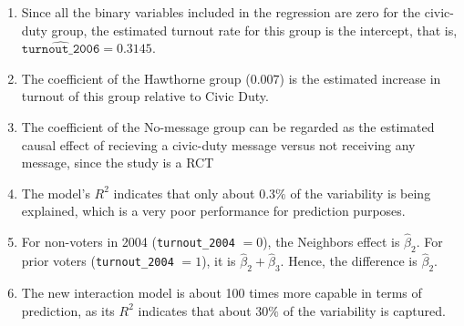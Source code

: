 \documentclass[11pt]{exam}
\begin{document}
\begin{questions}
\begin{solution}
\begin{enumerate}[label=(\alph*)]
  \item Since all the binary variables included in the regression are zero for the civic-duty group, the estimated turnout rate for this group is the intercept, that is, $\widehat{\texttt{turnout\_2006}} = 0.3145$.
  \item The coefficient of the Hawthorne group ($0.007$) is the estimated increase in turnout of this group relative to Civic Duty.
  \item The coefficient of the No-message group can be regarded as the estimated causal effect of recieving a civic-duty message versus not receiving any message, since the study is a RCT
  \item The model's $R^2$ indicates that only about $0.3\%$ of the variability is being explained, which is a very poor performance for prediction purposes.
  \item For non-voters in 2004 (\texttt{turnout\_2004} $= 0$), the Neighbors effect is $\widehat{\beta}_2$. For prior voters (\texttt{turnout\_2004} $= 1$), it is $\widehat{\beta}_2+\widehat{\beta}_3$. Hence, the difference is $\widehat{\beta}_2$.
  \item The new interaction model is about 100 times more capable in terms of prediction, as its $R^2$ indicates that about $30\%$ of the variability is captured.
\end{enumerate}
\end{solution}

\end{questions}
\end{document}
